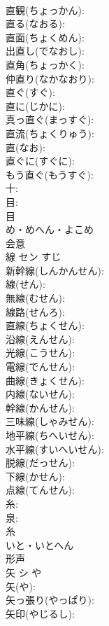 \documentclass[8pt]{extreport}
\begin{document}
\begin{CJK}{UTF8}{min}
\\	直観(ちょっかん): 
\\	直る(なおる): 
\\	直面(ちょくめん): 
\\	出直し(でなおし): 
\\	直角(ちょっかく): 
\\	仲直り(なかなおり): 
\\	直ぐ(すぐ): 
\\	直に(じかに): 
\\	真っ直ぐ(まっすぐ): 
\\	直流(ちょくりゅう): 
\\	直(なお): 
\\	直ぐに(すぐに): 
\\	もう直ぐ(もうすぐ): 
\\	十: 
\\	目: 
\\	目	
\\	め・めへん・よこめ	
\\	会意 
\\	線	セン	すじ		
\\	新幹線(しんかんせん): 
\\	線(せん): 
\\	無線(むせん): 
\\	線路(せんろ): 
\\	直線(ちょくせん): 
\\	沿線(えんせん): 
\\	光線(こうせん): 
\\	電線(でんせん): 
\\	曲線(きょくせん): 
\\	内線(ないせん): 
\\	幹線(かんせん): 
\\	三味線(しゃみせん): 
\\	地平線(ちへいせん): 
\\	水平線(すいへいせん): 
\\	脱線(だっせん): 
\\	下線(かせん): 
\\	点線(てんせん): 
\\	糸: 
\\	泉: 
\\	糸	
\\	いと・いとへん	
\\	形声 
\\	矢	シ	や		
\\	矢(や): 
\\	矢っ張り(やっぱり): 
\\	矢印(やじるし): 

\end{CJK}
\end{document}
